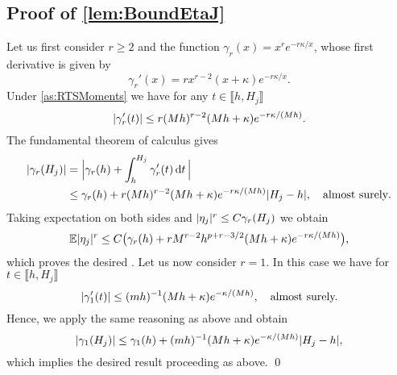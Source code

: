 \documentclass[10pt]{article}
\begin{document}
\subsection*{Proof of \cref{lem:BoundEtaJ}}
 Let us first consider $r \geq 2$ and the function $\gamma_r(x) = x^r e^{-r\kappa/x}$, whose first derivative is given by
	\begin{equation}
	\gamma_r'(x) = rx^{r-2}(x + \kappa) e^{-r\kappa/x}.
	\end{equation}
	Under \cref{as:RTSMoments} we have  for any $t \in \llbracket h, H_j\rrbracket$
	\begin{equation}
	\lvert\gamma_r'(t)\rvert \leq r (Mh)^{r-2} (Mh + \kappa)e^{-r\kappa/(Mh)}.
	\end{equation}
	The fundamental theorem of calculus gives
	\begin{equation}
	\begin{aligned}
	\lvert\gamma_r(H_j)\rvert &= \Big\lvert \gamma_r(h) + \int_{h}^{H_j} \gamma_r'(t) \,\mathrm{d} t \,\Big\rvert\\
	&\leq \gamma_r(h) + r (Mh)^{r-2} (Mh + \kappa)e^{-r\kappa/(Mh)} \lvert H_j - h\rvert, \quad \text{almost surely}.
	\end{aligned}
	\end{equation}
	Taking expectation on both sides and  $\lvert\eta_j\rvert^r \leq C\gamma_r(H_j)$ we obtain
	\begin{equation}
	\operatorname{\mathbb{E}}\lvert\eta_j\rvert^r \leq C\big(\gamma_r(h) + r M^{r-2} h^{p+r-3/2} (Mh + \kappa)e^{-r\kappa/(Mh)}\big),
	\end{equation} 
	which proves the desired . Let us now consider $r = 1$. In this case we have for $t \in \llbracket h, H_j\rrbracket$
	\begin{equation}
	\lvert\gamma_1'(t)\rvert \leq (mh)^{-1} (Mh + \kappa)e^{-\kappa/(Mh)}, \quad \text{almost surely.}
	\end{equation}
	Hence, we apply the same reasoning as above and obtain 
	\begin{equation}
	\lvert\gamma_1(H_j)\rvert \leq \gamma_1(h) + (mh)^{-1} (Mh + \kappa) e^{-\kappa/(Mh)} \lvert H_j - h\rvert,
	\end{equation}
	which implies the desired result  proceeding as above.  \qed
\end{document}
